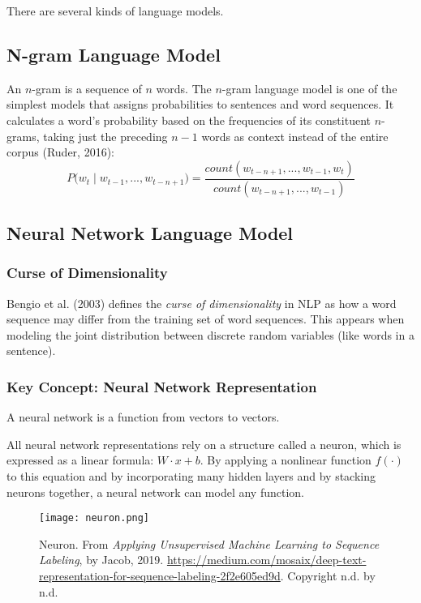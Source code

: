 There are several kinds of language models. 

\subsection{N-gram Language Model}

An $n$-gram is a sequence of $n$ words. The $n$-gram language model is one of the simplest models that assigns probabilities to sentences and word sequences. It calculates a word's probability based on the frequencies of its constituent $n$-grams, taking just the preceding $n-1$ words as context instead of the entire corpus (Ruder, 2016): 
$$
P \Big(w_t \; | \; w_{t-1}, ..., w_{t-n+1} \Big) = \frac {count(w_{t-n+1},...,w_{t-1},w_t)} {count(w_{t-n+1},...,w_{t-1})}
$$

\subsection{Neural Network Language Model}

\subsubsection{Curse of Dimensionality}

Bengio et al. (2003) defines the \emph{curse of dimensionality} in NLP as how a word sequence may differ from the training set of word sequences. This appears when modeling the joint distribution between discrete random variables (like words in a sentence). 

\subsubsection{Key Concept: Neural Network Representation}

A neural network is a function from vectors to vectors. 

All neural network representations rely on a structure called a neuron, which is expressed as a linear formula: $W \cdot x + b$. By applying a nonlinear function $f(\cdot)$ to this equation and by incorporating many hidden layers and by stacking neurons together, a neural network can model any function. 

\begin{figure}[h]
\vspace{-5pt}
\centering
\texttt{[image: neuron.png]}
\vspace{-5pt}
\caption{\footnotesize Neuron. From \emph{Applying Unsupervised Machine Learning to Sequence Labeling}, by Jacob, 2019. \url{https://medium.com/mosaix/deep-text-representation-for-sequence-labeling-2f2e605ed9d}. Copyright n.d. by n.d.}
\vspace{-5pt}
\end{figure}

